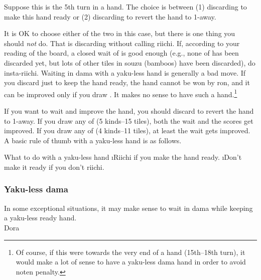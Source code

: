 Suppose this is the 5th turn in a hand. The choice is between (1) discarding {\LARGE{}} to make this hand ready or (2) discarding {\LARGE{}} to revert the hand to 1-away. 

\bigskip
It is OK to choose either of the two in this case, but there is one thing you should \emph{not} do. That is discarding {\LARGE{}} without calling riichi. 
If, according to your reading of the board, a closed wait of {\LARGE{}} is good enough (e.g., none of {\LARGE {}} has been discarded yet, but lots of other tiles in {\jap souzu} (bamboos) have been discarded), do insta-riichi. Waiting in {\jap dama} with a {\jap yaku}-less hand is generally a bad move. If you discard {\LARGE{}} just to keep the hand ready, the hand cannot be won by {\jap ron}, and it can be improved only if you draw {\LARGE{}}. It makes no sense to have such a hand.\footnote{Of course, if this were towards the very end of a hand (15th--18th turn), it would make a lot of sense to have a {\jap yaku}-less {\jap dama} hand in order to avoid {\jap noten} penalty.} 

\bigskip
If you want to wait and improve the hand, you should discard {\LARGE{}} to revert the hand to 1-away. If you draw any of {\LARGE{}} (5 kinds--15 tiles), both the wait and the scores get improved. If you draw any of {\LARGE{}} (4 kinds--11 tiles), at least the wait gets improved. 
A basic rule of thumb with a {\jap yaku}-less hand is as follows.

\newpage

\begin{itembox}[c]{What to do with a {\jap yaku}-less hand}
\bi
\i Riichi if you make the hand ready.
\i Don't make it ready if you don't riichi.
\vsps
\ei
\end{itembox}

\subsubsection*{{\jap Yaku}-less {\jap dama}}
In some exceptional situations, it may make sense to wait in {\jap dama} while keeping a {\jap yaku}-less ready hand. 
\bp
{}~~\\
\hfill\footnotesize{{\jap Dora}~~~~~~~~~~}
\ep

